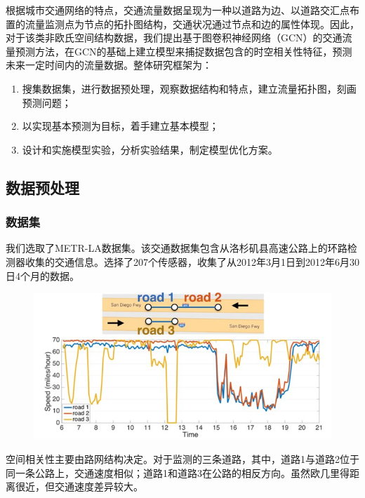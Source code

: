 \documentclass[UTF8]{ctexart}
\numberwithin{equation}{section}
\begin{document}
根据城市交通网络的特点，交通流量数据呈现为一种以道路为边、以道路交汇点布置的流量监测点为节点的拓扑图结构，交通状况通过节点和边的属性体现。因此，对于该类非欧氏空间结构数据，我们提出基于图卷积神经网络（GCN）的交通流量预测方法，在GCN的基础上建立模型来捕捉数据包含的时空相关性特征，预测未来一定时间内的流量数据。整体研究框架为：
\begin{enumerate}
	\item 搜集数据集，进行数据预处理，观察数据结构和特点，建立流量拓扑图，刻画预测问题；
	\item 以实现基本预测为目标，着手建立基本模型；
	\item 设计和实施模型实验，分析实验结果，制定模型优化方案。
\end{enumerate}

\subsection{数据预处理}
\subsubsection{数据集}
我们选取了METR-LA数据集\cite{bib:five}。该交通数据集包含从洛杉矶县高速公路上的环路检测器收集的交通信息。选择了207个传感器，收集了从2012年3月1日到2012年6月30日4个月的数据。
\begin{figure}[H]
	\centering
	\includegraphics[width=.7\textwidth]{data.jpg}
\end{figure}
空间相关性主要由路网结构决定。对于监测的三条道路，其中，道路1与道路2位于同一条公路上，交通速度相似；道路1和道路3在公路的相反方向。虽然欧几里得距离很近，但交通速度差异较大。
\end{document}

